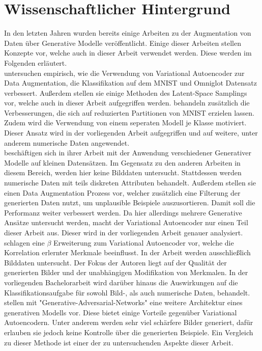 \chapter{Wissenschaftlicher Hintergrund}
In den letzten Jahren wurden bereits einige Arbeiten zu der Augmentation von Daten über Generative Modelle veröffentlicht. Einige dieser Arbeiten stellen Konzepte vor, welche auch in dieser Arbeit verwendet werden. Diese werden im Folgenden erläutert.\\

\cite{Jorge2018} untersuchen empirisch, wie die Verwendung von Variational Autoencoder zur Data Augmentation, die Klassifikation auf dem MNIST und Omniglot Datensatz verbessert. Außerdem stellen sie einige Methoden des Latent-Space Samplings vor, welche auch in dieser Arbeit aufgegriffen werden. \cite{Garay-Maestre2019} behandeln zusätzlich die Verbesserungen, die sich auf reduzierten Partitionen von MNIST erzielen lassen. Zudem wird die Verwendung von einem seperaten Modell je Klasse motiviert. Dieser Ansatz wird in der vorliegenden Arbeit aufgegriffen und auf weitere, unter anderem numerische Daten angewendet. \\

\cite{Moreno-Barea2020} beschäftigen sich in ihrer Arbeit mit der Anwendung verschiedener Generativer Modelle auf kleinen Datensätzen. Im Gegensatz zu den anderen Arbeiten in diesem Bereich, werden hier keine Bilddaten untersucht. Stattdessen werden numerische Daten mit teils diskreten Attributen behandelt. Außerdem stellen sie einen Data Augmentation Prozess vor, welcher zusätzlich eine Filterung der generierten Daten nutzt, um unplausible Beispiele auszusortieren. Damit soll die Performanz weiter verbessert werden. Da hier allerdings mehrere Generative Ansätze untersucht werden, macht der Variational Autoencoder nur einen Teil dieser Arbeit aus. Dieser wird in der vorliegenden Arbeit genauer analysiert. \\

\cite{Higgins2017} schlagen eine $\beta$ Erweiterung zum Variational Autoencoder vor, welche die Korrelation erlernter Merkmale beeinflusst. In der Arbeit werden ausschließlich Bilddaten untersucht. Der Fokus der Autoren liegt auf der Qualität der generierten Bilder und der unabhängigen Modifikation von Merkmalen. In der vorliegenden Bachelorarbeit wird darüber hinaus die Auswirkungen auf die Klassifikationsaufgabe für sowohl Bild-, als auch numerische Daten, behandelt. \\

\pagebreak
\cite{goodfellow2014generative} stellen mit "Generative-Adversarial-Networks" eine weitere Architektur eines generativen Modells vor. Diese bietet einige Vorteile gegenüber Variational Autoencodern. Unter anderem werden sehr viel schärfere Bilder generiert, dafür erlauben sie jedoch keine Kontrolle über die generierten Beispiele. Ein Vergleich zu dieser Methode ist einer der zu untersuchenden Aspekte dieser Arbeit.
